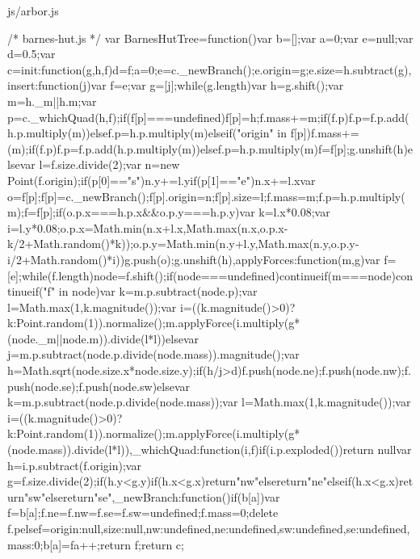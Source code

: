 \documentclass{article}
\begin{document}
\begin{chunk}{js/arbor.js}

  /* barnes-hut.js */  var BarnesHutTree=function(){var b=[];var a=0;var e=null;var d=0.5;var c={init:function(g,h,f){d=f;a=0;e=c._newBranch();e.origin=g;e.size=h.subtract(g)},insert:function(j){var f=e;var g=[j];while(g.length){var h=g.shift();var m=h._m||h.m;var p=c._whichQuad(h,f);if(f[p]===undefined){f[p]=h;f.mass+=m;if(f.p){f.p=f.p.add(h.p.multiply(m))}else{f.p=h.p.multiply(m)}}else{if("origin" in f[p]){f.mass+=(m);if(f.p){f.p=f.p.add(h.p.multiply(m))}else{f.p=h.p.multiply(m)}f=f[p];g.unshift(h)}else{var l=f.size.divide(2);var n=new Point(f.origin);if(p[0]=="s"){n.y+=l.y}if(p[1]=="e"){n.x+=l.x}var o=f[p];f[p]=c._newBranch();f[p].origin=n;f[p].size=l;f.mass=m;f.p=h.p.multiply(m);f=f[p];if(o.p.x===h.p.x&&o.p.y===h.p.y){var k=l.x*0.08;var i=l.y*0.08;o.p.x=Math.min(n.x+l.x,Math.max(n.x,o.p.x-k/2+Math.random()*k));o.p.y=Math.min(n.y+l.y,Math.max(n.y,o.p.y-i/2+Math.random()*i))}g.push(o);g.unshift(h)}}}},applyForces:function(m,g){var f=[e];while(f.length){node=f.shift();if(node===undefined){continue}if(m===node){continue}if("f" in node){var k=m.p.subtract(node.p);var l=Math.max(1,k.magnitude());var i=((k.magnitude()>0)?k:Point.random(1)).normalize();m.applyForce(i.multiply(g*(node._m||node.m)).divide(l*l))}else{var j=m.p.subtract(node.p.divide(node.mass)).magnitude();var h=Math.sqrt(node.size.x*node.size.y);if(h/j>d){f.push(node.ne);f.push(node.nw);f.push(node.se);f.push(node.sw)}else{var k=m.p.subtract(node.p.divide(node.mass));var l=Math.max(1,k.magnitude());var i=((k.magnitude()>0)?k:Point.random(1)).normalize();m.applyForce(i.multiply(g*(node.mass)).divide(l*l))}}}},_whichQuad:function(i,f){if(i.p.exploded()){return null}var h=i.p.subtract(f.origin);var g=f.size.divide(2);if(h.y<g.y){if(h.x<g.x){return"nw"}else{return"ne"}}else{if(h.x<g.x){return"sw"}else{return"se"}}},_newBranch:function(){if(b[a]){var f=b[a];f.ne=f.nw=f.se=f.sw=undefined;f.mass=0;delete f.p}else{f={origin:null,size:null,nw:undefined,ne:undefined,sw:undefined,se:undefined,mass:0};b[a]=f}a++;return f}};return c};

\end{chunk}
\end{document}
